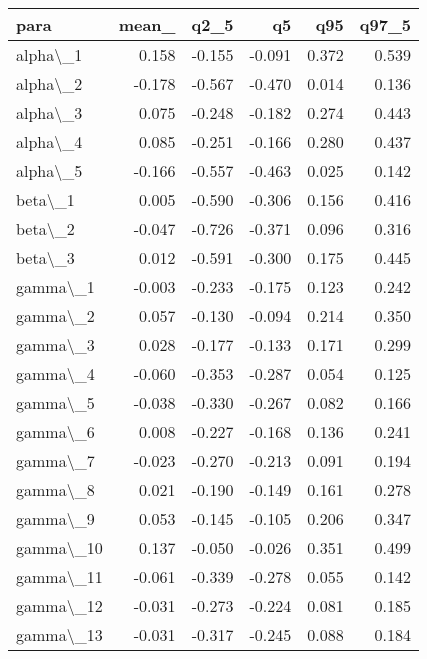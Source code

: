 \documentclass[
  11pt,
  letterpaper,
  DIV=11,
  numbers=noendperiod]{scrartcl}
\begin{document}
\begin{table}
\centering
\begin{tabular}[t]{l|r|r|r|r|r}
\hline
para & mean\_ & q2\_5 & q5 & q95 & q97\_5\\
\hline
alpha\textbackslash{}\_1 & 0.158 & -0.155 & -0.091 & 0.372 & 0.539\\
\hline
alpha\textbackslash{}\_2 & -0.178 & -0.567 & -0.470 & 0.014 & 0.136\\
\hline
alpha\textbackslash{}\_3 & 0.075 & -0.248 & -0.182 & 0.274 & 0.443\\
\hline
alpha\textbackslash{}\_4 & 0.085 & -0.251 & -0.166 & 0.280 & 0.437\\
\hline
alpha\textbackslash{}\_5 & -0.166 & -0.557 & -0.463 & 0.025 & 0.142\\
\hline
beta\textbackslash{}\_1 & 0.005 & -0.590 & -0.306 & 0.156 & 0.416\\
\hline
beta\textbackslash{}\_2 & -0.047 & -0.726 & -0.371 & 0.096 & 0.316\\
\hline
beta\textbackslash{}\_3 & 0.012 & -0.591 & -0.300 & 0.175 & 0.445\\
\hline
gamma\textbackslash{}\_1 & -0.003 & -0.233 & -0.175 & 0.123 & 0.242\\
\hline
gamma\textbackslash{}\_2 & 0.057 & -0.130 & -0.094 & 0.214 & 0.350\\
\hline
gamma\textbackslash{}\_3 & 0.028 & -0.177 & -0.133 & 0.171 & 0.299\\
\hline
gamma\textbackslash{}\_4 & -0.060 & -0.353 & -0.287 & 0.054 & 0.125\\
\hline
gamma\textbackslash{}\_5 & -0.038 & -0.330 & -0.267 & 0.082 & 0.166\\
\hline
gamma\textbackslash{}\_6 & 0.008 & -0.227 & -0.168 & 0.136 & 0.241\\
\hline
gamma\textbackslash{}\_7 & -0.023 & -0.270 & -0.213 & 0.091 & 0.194\\
\hline
gamma\textbackslash{}\_8 & 0.021 & -0.190 & -0.149 & 0.161 & 0.278\\
\hline
gamma\textbackslash{}\_9 & 0.053 & -0.145 & -0.105 & 0.206 & 0.347\\
\hline
gamma\textbackslash{}\_10 & 0.137 & -0.050 & -0.026 & 0.351 & 0.499\\
\hline
gamma\textbackslash{}\_11 & -0.061 & -0.339 & -0.278 & 0.055 & 0.142\\
\hline
gamma\textbackslash{}\_12 & -0.031 & -0.273 & -0.224 & 0.081 & 0.185\\
\hline
gamma\textbackslash{}\_13 & -0.031 & -0.317 & -0.245 & 0.088 & 0.184\\

\end{tabular}
\end{table}
\end{document}
